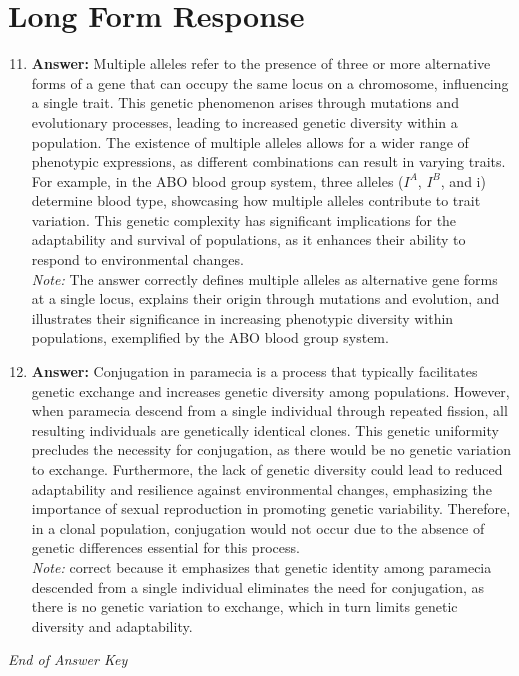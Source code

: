 \documentclass[12pt]{article}
\begin{document}
\section*{Long Form Response}
\begin{enumerate}[label=\arabic*.]
\setcounter{enumi}{10}
\item \textbf{Answer:} Multiple alleles refer to the presence of three or more alternative forms of a gene that can occupy the same locus on a chromosome, influencing a single trait. This genetic phenomenon arises through mutations and evolutionary processes, leading to increased genetic diversity within a population. The existence of multiple alleles allows for a wider range of phenotypic expressions, as different combinations can result in varying traits. For example, in the ABO blood group system, three alleles ($I^A$, $I^B$, and i) determine blood type, showcasing how multiple alleles contribute to trait variation. This genetic complexity has significant implications for the adaptability and survival of populations, as it enhances their ability to respond to environmental changes.
\\ \textit{Note:} The answer correctly defines multiple alleles as alternative gene forms at a single locus, explains their origin through mutations and evolution, and illustrates their significance in increasing phenotypic diversity within populations, exemplified by the ABO blood group system.
\item \textbf{Answer:} Conjugation in paramecia is a process that typically facilitates genetic exchange and increases genetic diversity among populations. However, when paramecia descend from a single individual through repeated fission, all resulting individuals are genetically identical clones. This genetic uniformity precludes the necessity for conjugation, as there would be no genetic variation to exchange. Furthermore, the lack of genetic diversity could lead to reduced adaptability and resilience against environmental changes, emphasizing the importance of sexual reproduction in promoting genetic variability. Therefore, in a clonal population, conjugation would not occur due to the absence of genetic differences essential for this process.
\\ \textit{Note:} correct because it emphasizes that genetic identity among paramecia descended from a single individual eliminates the need for conjugation, as there is no genetic variation to exchange, which in turn limits genetic diversity and adaptability.
\end{enumerate}

\vfill
\noindent\textit{End of Answer Key}
\end{document}
